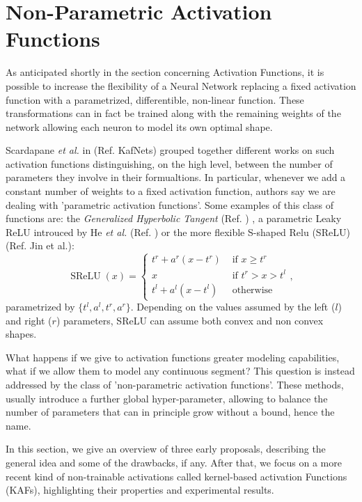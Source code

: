 \documentclass[LaM,binding=0.6cm]{./packages/sapthesis/sapthesis}
\begin{document}
    \chapter{Non-Parametric Activation Functions}
    \label{chap:4}
    As anticipated shortly in the section concerning Activation Functions, it is possible to increase the flexibility of a Neural Network replacing a fixed activation function with a parametrized, differentible, non-linear function.
    These transformations can in fact be trained along with the remaining weights of the network allowing each neuron to model its own optimal shape.

    Scardapane \textit{et al.} in (Ref. KafNets) grouped together different works on such activation functions distinguishing, on the high level, between the number of parameters they involve in their formualtions.
    In particular, whenever we add a constant number of weights to a fixed activation function, authors say we are dealing with 'parametric activation functions'. Some examples of this class of functions are: the \textit{Generalized Hyperbolic Tangent} (Ref. )
    , a parametric Leaky ReLU introuced by He \textit{et al.} (Ref. ) or the more flexible S-shaped Relu (SReLU) (Ref.  Jin et al.):
    \begin{equation}
        \label{srelu}
        \operatorname{SReLU}(x)=\left\{\begin{array}{ll}
            t^{r}+a^{r}\left(x-t^{r}\right) & \text { if } x \geq t^{r} \\
            x & \text { if } t^{r}>x>t^{l} \\
            t^{l}+a^{l}\left(x-t^{l}\right) & \text { otherwise }
            \end{array}\right.
            ,
    \end{equation}
    parametrized by $\{t^l,a^l,t^r,a^r\}$. Depending on the values assumed by the left ($l$) and right ($r$) parameters, SReLU can assume both convex and non convex shapes.

    What happens if we give to activation functions greater modeling capabilities, what if we allow them to model any continuous segment? This question is instead addressed by the class of 'non-parametric activation functions'. These methods,
    usually introduce a further global hyper-parameter, allowing to balance the number of parameters that can in principle grow without a bound, hence the name.

    In this section, we give an overview of three early proposals, describing the general idea and some of the drawbacks, if any. After that, we focus on a more recent kind of non-trainable activations called kernel-based activation Functions
    (KAFs), highlighting their properties and experimental results.
\end{document}

